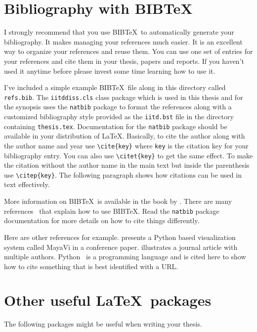 \documentclass[Other]{iitddiss}
\begin{document}
\section{Bibliography with BIB\TeX}

I strongly recommend that you use BIB\TeX\ to automatically generate
your bibliography.  It makes managing your references much easier.  It
is an excellent way to organize your references and reuse them.  You
can use one set of entries for your references and cite them in your
thesis, papers and reports.  If you haven't used it anytime before
please invest some time learning how to use it.

I've included a simple example BIB\TeX\ file along in this directory
called \verb+refs.bib+.  The \verb+iitddiss.cls+ class package which
is used in this thesis and for the synopsis uses the \verb+natbib+
package to format the references along with a customized bibliography
style provided as the \verb+iitd.bst+ file in the directory containing
\verb+thesis.tex+.  Documentation for the \verb+natbib+ package should
be available in your distribution of \LaTeX.  Basically, to cite the
author along with the author name and year use \verb+\cite{key}+ where
\verb+key+ is the citation key for your bibliography entry.  You can
also use \verb+\citet{key}+ to get the same effect.  To make the
citation without the author name in the main text but inside the
parenthesis use \verb+\citep{key}+.  The following paragraph shows how
citations can be used in text effectively.

More information on BIB\TeX\ is available in the book by
\cite{lamport:86}.  There are many
references~\citep{lamport:86,sai:16} that explain how to use
BIB\TeX.  Read the \verb+natbib+ package documentation for more
details on how to cite things differently.

Here are other references for example.  \citet{viz:mayavi} presents a
Python based visualization system called MayaVi in a conference paper.
\citet{pan:pr:flat-fst} illustrates a journal article with multiple
authors.  Python~\citep{py:python} is a programming language and is
cited here to show how to cite something that is best identified with
a URL.

\section{Other useful \LaTeX\ packages}

The following packages might be useful when writing your thesis.
\end{document}
